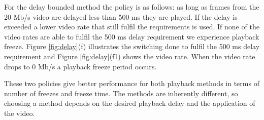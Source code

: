 For the delay bounded method the policy is as follows: as long as frames from the 20 Mb/s video are delayed less than 500 ms they are played. If the delay is exceeded a lower video rate that still fulfil the requirements is used. If none of the video rates are able to fulfil the 500 ms delay requirement we experience playback freeze. Figure \ref{fig:delay}(f) illustrates the switching done to fulfil the 500 ms delay requirement and Figure \ref{fig:delay}(f1) shows the video rate. When the video rate drops to 0 Mb/s a playback freeze period occurs.

These two policies give better performance for both playback methods in terms of number of freezes and freeze time. The methods are inherently different, so choosing a method depends on the desired playback delay and the application of the video.



